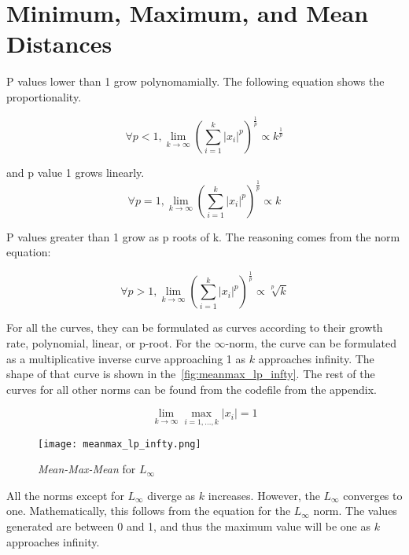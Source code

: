 \section{Minimum, Maximum, and Mean Distances}

P values lower than 1 grow polynomamially.
The following equation shows the proportionality.


\begin{equation}
    \forall p < 1, \lim_{k \to \infty} \left( \sum_{i=1}^{k} |x_i|^p \right)^{\frac{1}{p}} \propto k^{\frac{1}{p}}
\end{equation}


and p value 1 grows linearly.
\begin{equation}
    \forall p = 1, \lim_{k \to \infty} \left( \sum_{i=1}^{k} |x_i|^p \right)^{\frac{1}{p}} \propto k
\end{equation}

P values greater than 1 grow as p roots of k. The reasoning comes from the norm equation:

\begin{equation}
    \forall p > 1, \lim_{k \to \infty} \left( \sum_{i=1}^{k} |x_i|^p \right)^{\frac{1}{p}} \propto \sqrt[p]{k}
\end{equation}


For all the curves, they can be formulated as curves according to their growth rate, polynomial, linear, or p-root. For the \(\infty\)-norm, the curve can be formulated as a multiplicative inverse curve approaching 1 as \(k\) approaches infinity. The shape of that curve is shown in the~\autoref{fig:meanmax_lp_infty}. The rest of the curves for all other norms can be found from the codefile from the appendix.

\begin{equation}
    \lim_{k \to \infty} \max_{i=1,\ldots,k} |x_i| = 1
\end{equation}

\FloatBarrier  %

\begin{figure}[htbp]
    \centering
    \texttt{[image: meanmax\_lp\_infty.png]}
    \caption{\emph{Mean-Max-Mean} for $L_{\infty}$}
    \label{fig:meanmax_lp_infty}
\end{figure}

All the norms except for \( L_\infty \) diverge as \(k\) increases. However, the \( L_\infty \) converges to one. Mathematically, this follows from the equation for the \( L_\infty \) norm. The values generated are between 0 and 1, and thus the maximum value will be one as \(k\) approaches infinity.

\FloatBarrier  %
